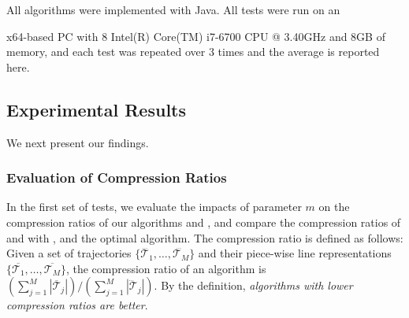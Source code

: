 All algorithms were implemented with Java.
All tests were run on an {x64-based  PC with 8 Intel(R) Core(TM) i7-6700 CPU @ 3.40GHz and 8GB of memory, and each test was repeated
over 3 times and the average is reported here.

%

\subsection{Experimental Results}

We next present our findings.

\subsubsection{Evaluation of Compression Ratios}


In the first set of tests, we evaluate the impacts of parameter $m$ on the
compression ratios of our algorithms \cist and \cista, and compare the compression ratios of \cist and \cista with \dps, \squishe and the optimal algorithm.
%
The compression ratio is defined as follows: Given a set of trajectories $\{\dddot{\mathcal{T}_1}, \ldots, \dddot{\mathcal{T}_M}\}$ and their piece-wise line representations $\{\overline{\mathcal{T}_1}, \ldots, \overline{\mathcal{T}_M}\}$, the compression ratio of an algorithm is $(\sum_{j=1}^{M} |\overline{\mathcal{T}}_j |)/(\sum_{j=1}^{M} |\dddot{\mathcal{T}}_j |)$.
By the definition, \emph{algorithms with lower compression ratios are better}.







}
